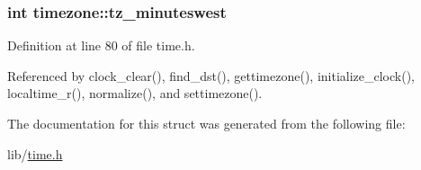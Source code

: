 \subsubsection[{\texorpdfstring{tz\+\_\+minuteswest}{tz_minuteswest}}]{\setlength{\rightskip}{0pt plus 5cm}int timezone\+::tz\+\_\+minuteswest}\hypertarget{structtimezone_a3042f7eff6e1b980728def76b1fa0eb7}{}\label{structtimezone_a3042f7eff6e1b980728def76b1fa0eb7}


Definition at line 80 of file time.\+h.



Referenced by clock\+\_\+clear(), find\+\_\+dst(), gettimezone(), initialize\+\_\+clock(), localtime\+\_\+r(), normalize(), and settimezone().



The documentation for this struct was generated from the following file\+:\begin{DoxyCompactItemize}
\item 
lib/\hyperlink{time_8h}{time.\+h}\end{DoxyCompactItemize}
